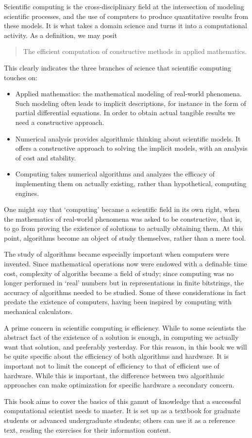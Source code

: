 Scientific computing is the cross-disciplinary field at the
intersection of modeling scientific processes, and the use of
computers to produce quantitative results from these models.
It is what takes a domain science and turns it into a computational
activity.
%
As a definition, we may posit
\begin{quote}
  The efficient computation of constructive methods in applied mathematics.
\end{quote}
This clearly indicates the three branches of science that scientific
computing touches on:
\begin{itemize}
\item Applied mathematics: the mathematical modeling of real-world
  phenomena. Such modeling often leads to implicit descriptions, for
  instance in the form of partial differential equations. In order to
  obtain actual tangible results we need a constructive approach.
\item Numerical analysis provides algorithmic thinking about
  scientific models. It offers a constructive approach to solving the
  implicit models, with an analysis of cost and stability.
\item Computing takes numerical algorithms and analyzes the efficacy
  of implementing them on actually existing, rather than hypothetical,
  computing engines.
\end{itemize}

One might say that `computing' became a scientific field in its own
right, when the mathematics of real-world phenomena was asked to be
constructive, that is, to go from proving the existence of solutions
to actually obtaining them. At this point, algorithms become an object
of study themselves, rather than a mere tool.

The study of algorithms became especially important when computers were
invented. Since mathematical operations now were endowed with a
definable time cost, complexity of algoriths became a field of study;
since computing was no longer performed in `real' numbers but in
representations in finite bitstrings, the accuracy of algorithms
needed to be studied. Some of these considerations in fact predate the
existence of computers, having been inspired by computing with
mechanical calculators.

A prime concern in scientific computing is efficiency. While to some
scientists the abstract fact of the existence of a solution is enough,
in computing we actually want that solution, and preferably
yesterday. For this reason, in this book we will be quite specific about the
efficiency of both algorithms and hardware. It is important not to
limit the concept of efficiency to that of efficient use of
hardware. While this is important, the difference between two
algorithmic approaches can make optimization for specific hardware a
secondary concern.

This book aims to cover the basics of this gamut of knowledge that a
successful computational scientist needs to master. It is set up as a
textbook for graduate students or advanced undergraduate students;
others can use it as a reference text, reading the exercises for their
information content.

